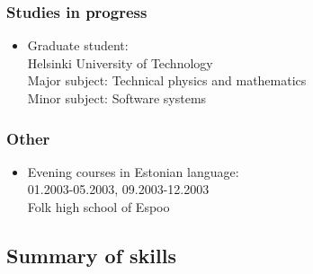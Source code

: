 \documentclass[a4paper,12pt]{article}
\begin{document}
\subsubsection*{Studies in progress}
\begin{itemize}
\item
Graduate student: \\
Helsinki University of Technology \\
Major subject: Technical physics and mathematics \\
Minor subject: Software systems
\end{itemize}

\subsubsection*{Other}
\begin{itemize}
\item
Evening courses in Estonian language: \\
01.2003-05.2003, 09.2003-12.2003 \\
Folk high school of Espoo
\end{itemize}

\subsection*{Summary of skills}
\end{document}
